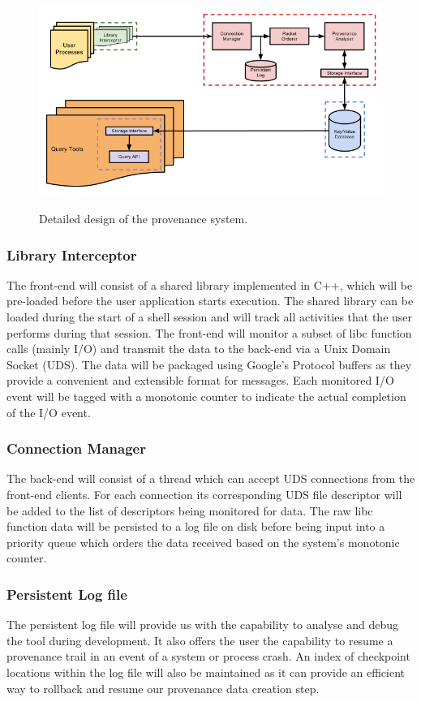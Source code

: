 \begin{figure}
\includegraphics[width=\textwidth]{res/ProvDesign.png}
\label{fig:detdes}
\caption{Detailed design of the provenance system.}
\end{figure}

\subsubsection{Library Interceptor}
The front-end will consist of a shared library implemented in C++, which will be pre-loaded before the user application starts execution. The shared library can be loaded during the start of a shell session and will track all activities that the user performs during that session. The front-end will monitor a subset of libc function calls (mainly I/O) and transmit the data to the back-end via a Unix Domain Socket (UDS). The data will be packaged using Google's Protocol buffers as they provide a convenient and extensible format for messages. Each monitored I/O event will be tagged with a monotonic counter to indicate the actual completion of the I/O event.

\subsubsection{Connection Manager}
The back-end will consist of a thread which can accept UDS connections from the front-end clients. For each connection its corresponding UDS file descriptor will be added to the list of descriptors being monitored for data. The raw libc function data will be persisted to a log file on disk before being input into a priority queue which orders the data received based on the system's monotonic counter.

\subsubsection{Persistent Log file}
The persistent log file will provide us with the capability to analyse and debug the tool during development. It also offers the user the capability to resume a provenance trail in an event of a system or process crash. An index of checkpoint locations within the log file will also be maintained as it can provide an efficient way to rollback and resume our provenance data creation step.

